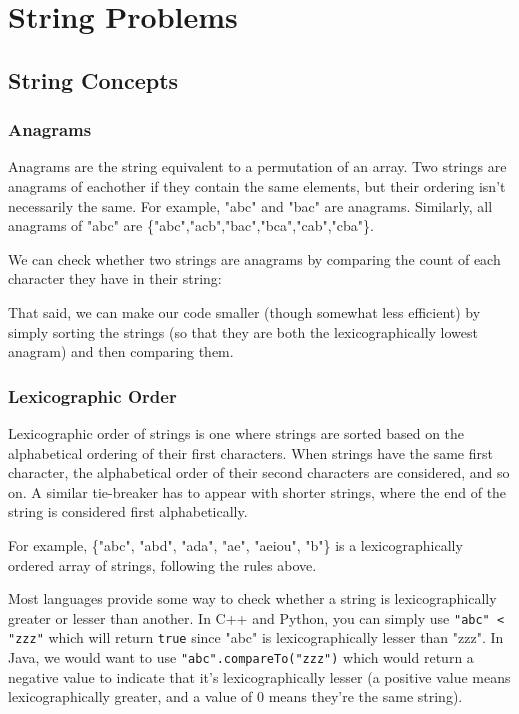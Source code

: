 \section{String Problems}
\subsection{String Concepts}

\subsubsection{Anagrams}

Anagrams are the string equivalent to a permutation of an array. Two strings are anagrams of eachother if they contain the same elements, but their ordering isn't necessarily the same. For example, "abc" and "bac" are anagrams. Similarly, all anagrams of "abc" are \{"abc","acb","bac","bca","cab","cba"\}.

We can check whether two strings are anagrams by comparing the count of each character they have in their string:


That said, we can make our code smaller (though somewhat less efficient) by simply sorting the strings (so that they are both the lexicographically lowest anagram) and then comparing them.


\subsubsection{Lexicographic Order}

Lexicographic order of strings is one where strings are sorted based on the alphabetical ordering of their first characters. When strings have the same first character, the alphabetical order of their second characters are considered, and so on. A similar tie-breaker has to appear with shorter strings, where the end of the string is considered first alphabetically.

For example, \{"abc", "abd", "ada", "ae", "aeiou", "b"\} is a lexicographically ordered array of strings, following the rules above.

Most languages provide some way to check whether a string is lexicographically greater or lesser than another. In C++ and Python, you can simply use \texttt{"abc" < "zzz"} which will return \texttt{true} since "abc" is lexicographically lesser than "zzz". In Java, we would want to use \texttt{"abc".compareTo("zzz")} which would return a negative value to indicate that it's lexicographically lesser (a positive value means lexicographically greater, and a value of 0 means they're the same string).

